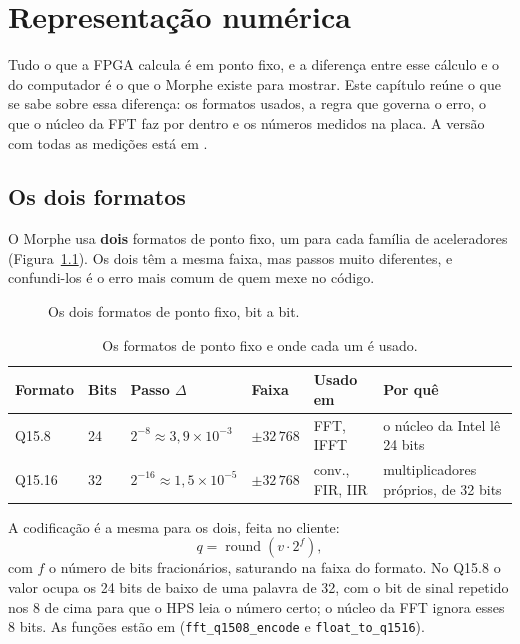 \chapter{Representação numérica}
\label{cap:numerica}

Tudo o que a FPGA calcula é em ponto fixo, e a diferença entre esse cálculo e
o do computador é o que o Morphe existe para mostrar. Este capítulo reúne o que
se sabe sobre essa diferença: os formatos usados, a regra que governa o erro,
o que o núcleo da FFT faz por dentro e os números medidos na placa. A versão
com todas as medições está em .

\section{Os dois formatos}

O Morphe usa \textbf{dois} formatos de ponto fixo, um para cada família de
aceleradores (Figura~\ref{fig:ponto-fixo}). Os dois têm a mesma faixa, mas
passos muito diferentes, e confundi-los é o erro mais comum de quem mexe no
código.

\begin{figure}[htbp]
  \centering
  \caption{Os dois formatos de ponto fixo, bit a bit.}
  \label{fig:ponto-fixo}
\end{figure}

\begin{table}[htbp]
  \centering
  \small
  \caption{Os formatos de ponto fixo e onde cada um é usado.}
  \label{tab:formatos}
  \begin{tabularx}{\textwidth}{@{}lllllX@{}}
    \toprule
    \textbf{Formato} & \textbf{Bits} & \textbf{Passo} \(\Delta\)
      & \textbf{Faixa} & \textbf{Usado em} & \textbf{Por quê} \\
    \midrule
    Q15.8 & 24 & \(2^{-8} \approx 3{,}9\times10^{-3}\) & \(\pm 32\,768\)
      & FFT, IFFT & o núcleo da Intel lê 24 bits \\
    Q15.16 & 32 & \(2^{-16} \approx 1{,}5\times10^{-5}\) & \(\pm 32\,768\)
      & conv., FIR, IIR & multiplicadores próprios, de 32 bits \\
    \bottomrule
  \end{tabularx}
\end{table}

A codificação é a mesma para os dois, feita no cliente:
\[
  q = \operatorname{round}\!\left(v \cdot 2^{f}\right),
\]
com \(f\) o número de bits fracionários, saturando na faixa do formato. No
Q15.8 o valor ocupa os 24 bits de baixo de uma palavra de 32, com o bit de
sinal repetido nos 8 de cima para que o HPS leia o número certo; o núcleo da
FFT ignora esses 8 bits. As funções estão em 
(\texttt{fft\_q1508\_encode} e \texttt{float\_to\_q1516}).

